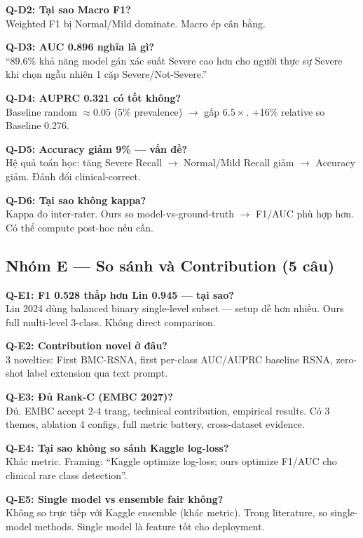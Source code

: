 \documentclass[11pt,a4paper]{article}
\begin{document}
\textbf{Q-D2: Tại sao Macro F1?}\\
Weighted F1 bị Normal/Mild dominate. Macro ép cân bằng.

\textbf{Q-D3: AUC 0.896 nghĩa là gì?}\\
``$89.6\%$ khả năng model gán xác suất Severe cao hơn cho người thực
sự Severe khi chọn ngẫu nhiên 1 cặp Severe/Not-Severe.''

\textbf{Q-D4: AUPRC 0.321 có tốt không?}\\
Baseline random $\approx 0.05$ (5\% prevalence) $\to$ gấp $6.5\times$.
+16\% relative so Baseline 0.276.

\textbf{Q-D5: Accuracy giảm 9\% --- vấn đề?}\\
Hệ quả toán học: tăng Severe Recall $\to$ Normal/Mild Recall giảm
$\to$ Accuracy giảm. Đánh đổi clinical-correct.

\textbf{Q-D6: Tại sao không kappa?}\\
Kappa đo inter-rater. Ours so model-vs-ground-truth $\to$ F1/AUC phù
hợp hơn. Có thể compute post-hoc nếu cần.

\subsection*{Nhóm E — So sánh và Contribution (5 câu)}

\textbf{Q-E1: F1 0.528 thấp hơn Lin 0.945 --- tại sao?}\\
Lin 2024 dùng balanced binary single-level subset --- setup dễ hơn
nhiều. Ours full multi-level 3-class. Không direct comparison.

\textbf{Q-E2: Contribution novel ở đâu?}\\
3 novelties: First BMC-RSNA, first per-class AUC/AUPRC baseline RSNA,
zero-shot label extension qua text prompt.

\textbf{Q-E3: Đủ Rank-C (EMBC 2027)?}\\
Đủ. EMBC accept 2-4 trang, technical contribution, empirical results.
Có 3 themes, ablation 4 configs, full metric battery, cross-dataset
evidence.

\textbf{Q-E4: Tại sao không so sánh Kaggle log-loss?}\\
Khác metric. Framing: ``Kaggle optimize log-loss; ours optimize
F1/AUC cho clinical rare class detection''.

\textbf{Q-E5: Single model vs ensemble fair không?}\\
Không so trực tiếp với Kaggle ensemble (khác metric). Trong
literature, so single-model methods. Single model là feature tốt cho
deployment.
\end{document}
